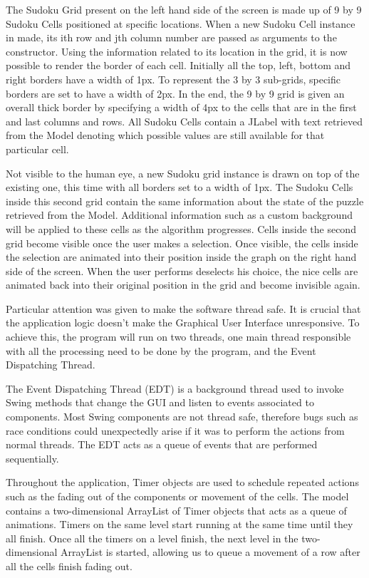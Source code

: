 \documentclass{l4proj}
\begin{document}
\noindent The Sudoku Grid present on the left hand side of the screen is made up of 9 by 9 Sudoku Cells positioned at specific locations. When a new Sudoku Cell instance in made, its ith row and jth column number are passed as arguments to the constructor. Using the information related to its location in the grid, it is now possible to render the border of each cell. Initially all the top, left, bottom and right borders have a width of 1px. To represent the 3 by 3 sub-grids, specific borders are set to have a width of 2px. In the end, the 9 by 9 grid is given an overall thick border by specifying a width of 4px to the cells that are in the first and last columns and rows. All Sudoku Cells contain a JLabel with text retrieved from the Model denoting which possible values are still available for that particular cell.

\noindent Not visible to the human eye, a new Sudoku grid instance is drawn on top of the existing one, this time with all borders set to a width of 1px. The Sudoku Cells inside this second grid contain the same information about the state of the puzzle retrieved from the Model. Additional information such as a custom background will be applied to these cells as the algorithm progresses. Cells inside the second grid become visible once the user makes a selection. Once visible, the cells inside the selection are animated into their position inside the graph on the right hand side of the screen. When the user performs deselects his choice, the nice cells are animated back into their original position in the grid and become invisible again.
 
\noindent Particular attention was given to make the software thread safe. It is crucial that the application logic doesn’t make the Graphical User Interface unresponsive. To achieve this, the program will run on two threads, one main thread responsible with all the processing need to be done by the program, and the Event Dispatching Thread. 

\noindent The Event Dispatching Thread (EDT) is a background thread used to invoke Swing methods that change the GUI and listen to events associated to components. Most Swing components are not thread safe, therefore bugs such as race conditions could unexpectedly arise if it was to perform the actions from normal threads. The EDT acts as a queue of events that are performed sequentially.

\noindent Throughout the application, Timer objects are used to schedule repeated actions such as the fading out of the components or movement of the cells. The model contains a two-dimensional ArrayList of Timer objects that acts as a queue of animations. Timers on the same level start running at the same time until they all finish. Once all the timers on a level finish, the next level in the two-dimensional ArrayList is started, allowing us to queue a movement of a row after all the cells finish fading out.
\end{document}
